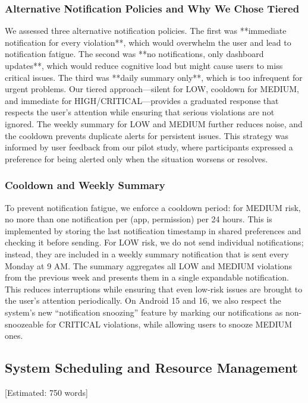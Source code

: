 \subsubsection{Alternative Notification Policies and Why We Chose Tiered}

We assessed three alternative notification policies. The first was **immediate notification for every violation**, which would overwhelm the user and lead to notification fatigue. The second was **no notifications, only dashboard updates**, which would reduce cognitive load but might cause users to miss critical issues. The third was **daily summary only**, which is too infrequent for urgent problems. Our tiered approach—silent for LOW, cooldown for MEDIUM, and immediate for HIGH/CRITICAL—provides a graduated response that respects the user's attention while ensuring that serious violations are not ignored. The weekly summary for LOW and MEDIUM further reduces noise, and the cooldown prevents duplicate alerts for persistent issues. This strategy was informed by user feedback from our pilot study, where participants expressed a preference for being alerted only when the situation worsens or resolves.

\subsubsection{Cooldown and Weekly Summary}

To prevent notification fatigue, we enforce a cooldown period: for MEDIUM risk, no more than one notification per (app, permission) per 24 hours. This is implemented by storing the last notification timestamp in shared preferences and checking it before sending. For LOW risk, we do not send individual notifications; instead, they are included in a weekly summary notification that is sent every Monday at 9 AM. The summary aggregates all LOW and MEDIUM violations from the previous week and presents them in a single expandable notification. This reduces interruptions while ensuring that even low-risk issues are brought to the user's attention periodically. On Android 15 and 16, we also respect the system's new ``notification snoozing'' feature by marking our notifications as non-snoozeable for CRITICAL violations, while allowing users to snooze MEDIUM ones.

\subsection{System Scheduling and Resource Management} [Estimated: 750 words]

